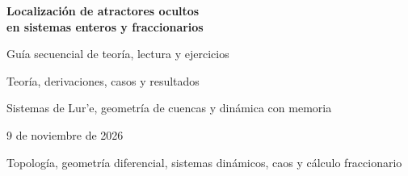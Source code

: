 \documentclass[11pt,a4paper]{article}
\numberwithin{equation}{section}
\begin{document}
\hypersetup{pageanchor=false}
\begin{titlepage}
\centering
\vspace*{0.18\textheight}
{\LARGE\bfseries Localización de atractores ocultos\\[0.35em]
en sistemas enteros y fraccionarios\par}
\vspace{1.2em}
\ifdefined\HAFOPrintEdition
  {\Large Guía secuencial de teoría, lectura y ejercicios\par}
\else
  {\Large Teoría, derivaciones, casos y resultados\par}
\fi
\vspace{1.5em}
{\large Sistemas de Lur'e, geometría de cuencas y dinámica con memoria\par}
\vspace{0.5em}
{9 de noviembre de 2026\par}
\vfill
{\large Topología, geometría diferencial, sistemas dinámicos, caos y
cálculo fraccionario\par}
\end{titlepage}

\begin{abstract}
Estudiamos la localización de atractores ocultos en sistemas de orden entero
y en problemas de valor inicial de Caputo. Combinamos la representación de
Lur'e, el balance armónico, la continuación y la geometría del campo para
construir condiciones iniciales y analizar sus destinos. La distinción entre
una semilla y su evolución permite relacionar las condiciones algebraicas con
la atracción y con la posición de las cuencas respecto de los equilibrios.

En orden entero, los sistemas de Chua, Kalman--Fitts, MAVPD y PLL muestran
tanto rutas de localización como obstrucciones del cierre armónico directo.
En orden fraccionario, el terminal inferior y la historia forman parte del
estado dinámico: transportamos esa historia en la continuación y distinguimos
el predictor estacionario del problema causal que se integra. El análisis de
equilibrios, espectros, retornos y sondeos de vecindades se complementa con
comparaciones entre integradores, pasos y horizontes. Los resultados permiten
examinar en qué sistemas cada generador de semillas resulta útil y cómo la
memoria y la discretización modifican la interpretación de las trayectorias.
\end{abstract}
\clearpage

\ifdefined\HAFOPrintEdition
\clearpage
\tableofcontents
\else
\tableofcontents
\fi
\clearpage
\hypersetup{pageanchor=true}
\end{document}
